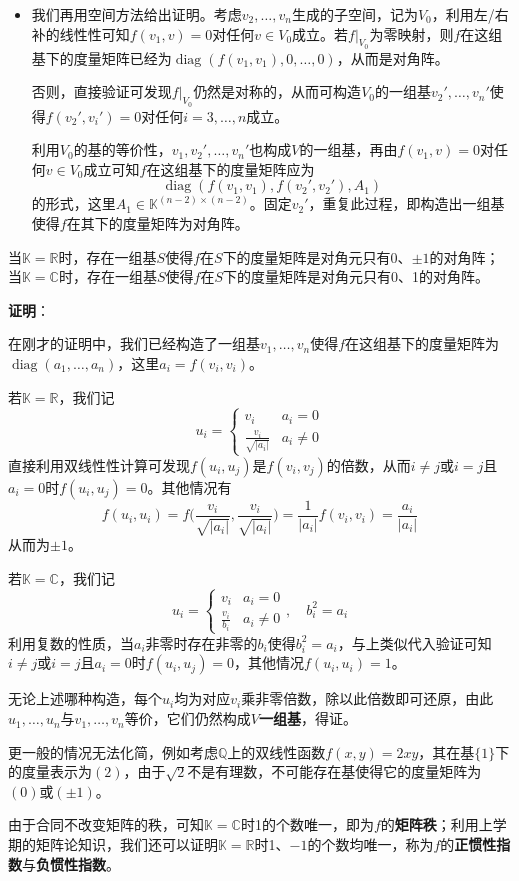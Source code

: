 \documentclass[a4paper,UTF8,fontset=windows,AutoFakeBold]{ctexart}
\DeclareMathOperator{\diag}{diag}
\newcommand*{\note}{\noindent *}
\newcommand{\proo}[1]{{\vspace{5pt}\kaishu\noindent\textbf{证明}：\vspace{-3pt}
\begin{compactitem}
    \item[] #1
\end{compactitem}
}}
\begin{document}
{\begin{itemize}
        \note 这个\textbf{递减阶数归纳}过程在上学期证明相似三角化、正交相似对角化等过程时十分常用。
        
        \item 我们再用空间方法给出证明。考虑$v_2,\dots,v_n$生成的子空间，记为$V_0$，利用左/右补的线性性可知$f(v_1,v)=0$对任何$v\in V_0$成立。若$f|_{V_0}$为零映射，则$f$在这组基下的度量矩阵已经为$\diag(f(v_1,v_1),0,\dots,0)$，从而是对角阵。
        
        否则，直接验证可发现$f|_{V_0}$仍然是对称的，从而可构造$V_0$的一组基$v_2',\dots,v_n'$使得$f(v_2',v_i')=0$对任何$i=3,\dots,n$成立。

        利用$V_0$的基的等价性，$v_1,v_2',\dots,v_n'$也构成$V$的一组基，再由$f(v_1,v)=0$对任何$v\in V_0$成立可知$f$在这组基下的度量矩阵应为
        $$\diag(f(v_1,v_1),f(v_2',v_2'),A_1)$$
        的形式，这里$A_1\in\mathbb{K}^{(n-2)\times(n-2)}$。固定$v_2'$，重复此过程，即构造出一组基使得$f$在其下的度量矩阵为对角阵。
    \end{itemize}
}

当$\mathbb{K}=\mathbb{R}$时，存在一组基$S$使得$f$在$S$下的度量矩阵是对角元只有0、$\pm1$的对角阵；当$\mathbb{K}=\mathbb{C}$时，存在一组基$S$使得$f$在$S$下的度量矩阵是对角元只有0、1的对角阵。

\proo{
    在刚才的证明中，我们已经构造了一组基$v_1,\dots,v_n$使得$f$在这组基下的度量矩阵为$\diag(a_1,\dots,a_n)$，这里$a_i=f(v_i,v_i)$。

    若$\mathbb{K}=\mathbb{R}$，我们记
    $$u_i=\begin{cases}v_i&a_i=0\\\frac{v_i}{\sqrt{|a_i|}}&a_i\ne0\end{cases}$$
    直接利用双线性性计算可发现$f(u_i,u_j)$是$f(v_i,v_j)$的倍数，从而$i\ne j$或$i=j$且$a_i=0$时$f(u_i,u_j)=0$。其他情况有
    $$f(u_i,u_i)=f\bigg(\frac{v_i}{\sqrt{|a_i|}},\frac{v_i}{\sqrt{|a_i|}}\bigg)=\frac{1}{|a_i|}f(v_i,v_i)=\frac{a_i}{|a_i|}$$
    从而为$\pm1$。

    若$\mathbb{K}=\mathbb{C}$，我们记
    $$u_i=\begin{cases}v_i&a_i=0\\\frac{v_i}{b_i}&a_i\ne0\end{cases},\quad b_i^2=a_i$$
    利用复数的性质，当$a_i$非零时存在非零的$b_i$使得$b_i^2=a_i$，与上类似代入验证可知$i\ne j$或$i=j$且$a_i=0$时$f(u_i,u_j)=0$，其他情况$f(u_i,u_i)=1$。

    无论上述哪种构造，每个$u_i$均为对应$v_i$乘非零倍数，除以此倍数即可还原，由此$u_1,\dots,u_n$与$v_1,\dots,v_n$等价，它们仍然构成$V$\textbf{一组基}，得证。

    \note 更一般的情况无法化简，例如考虑$\mathbb{Q}$上的双线性函数$f(x,y)=2xy$，其在基$\{1\}$下的度量表示为$(2)$，由于$\sqrt{2}$不是有理数，不可能存在基使得它的度量矩阵为$(0)$或$(\pm1)$。

    \note 由于合同不改变矩阵的秩，可知$\mathbb{K}=\mathbb{C}$时1的个数唯一，即为$f$的\textbf{矩阵秩}；利用上学期的矩阵论知识，我们还可以证明$\mathbb{K}=\mathbb{R}$时1、$-1$的个数均唯一，称为$f$的\textbf{正惯性指数}与\textbf{负惯性指数}。
}
\end{document}
